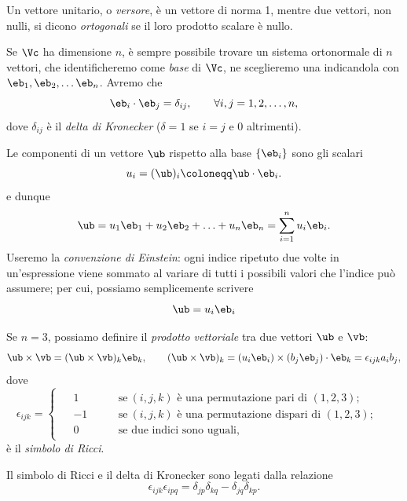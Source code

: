 Un vettore unitario, o \textit{versore}, è un vettore di norma 1, mentre due vettori, non nulli, si dicono \textit{ortogonali} se il loro prodotto scalare è nullo.

Se $\Vc$ ha dimensione $n$, è sempre possibile trovare un sistema ortonormale di $n$ vettori, che identificheremo come \textit{base} di $\Vc$, ne sceglieremo una indicandola con $\eb_1, \eb_2, \ldots \eb_n$. Avremo che
\begin{equation}
\eb_i \cdot \eb_j=\delta_{ij}, \qquad \forall i,j=1,2,\ldots, n,
\end{equation}
dove $\delta_{ij}$ è il \textit{delta di Kronecker} ($\delta=1$ se $i=j$ e 0 altrimenti).


Le componenti di un vettore $\ub$ rispetto alla base $\{\eb_i\}$ sono gli scalari
\begin{equation}
u_i=(\ub)_i\coloneqq \ub \cdot \eb_i.
\end{equation}
e dunque
\begin{equation}
\ub =u_1 \eb_1+ u_2\eb_2+\ldots+u_n \eb_n=\sum_{i=1}^n u_i \eb_i.
\end{equation}
Useremo la \textit{convenzione di Einstein}: ogni indice ripetuto due volte in un'espressione viene sommato al variare di tutti i possibili valori che l'indice può assumere; per cui, possiamo semplicemente scrivere
\begin{equation}
\ub=u_i \eb_i
\end{equation}

Se $n=3$, possiamo definire il \textit{prodotto vettoriale} tra due vettori $\ub$ e $\vb$:
\begin{equation}
\ub \times \vb =(\ub \times \vb)_k \eb_k, \qquad (\ub \times \vb)_k=(u_i \eb_i)\times (b_j\eb_j)\cdot \eb_k=\epsilon_{ijk}a_i b_j,
\end{equation}
dove 
\begin{equation}\label{Ricci}
	\epsilon_{ijk}=
	\begin{cases}
\begin{aligned}
		&1 \qquad &&\mathrm{se~}(i,j,k)\text{ è una permutazione pari di }(1,2,3);\\
	&-1  &&\mathrm{se~}(i,j,k)\text{ è una permutazione dispari di }(1,2,3);\\
	&0 &&\text{se due indici sono uguali,}&
\end{aligned}
	\end{cases}
\end{equation}
è il  \textit{simbolo di Ricci}.

Il simbolo di Ricci e il delta di Kronecker sono legati dalla relazione 
\begin{equation}\label{epsdel}
	\epsilon_{ijk}\epsilon_{ipq}=\delta_{jp}\delta_{kq}-\delta_{jq}\delta_{kp}.
\end{equation}

